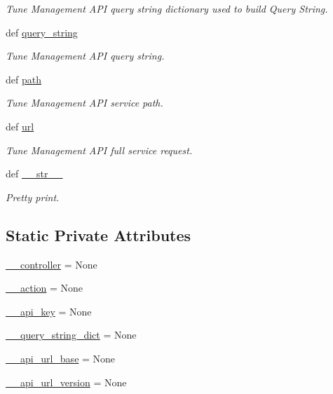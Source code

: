 \begin{DoxyCompactItemize}
\begin{DoxyCompactList}\small\item\em Tune Management A\-P\-I query string dictionary used to build Query String. \end{DoxyCompactList}\item 
def \hyperlink{classtune_1_1management_1_1service_1_1request_1_1Request_adfe1bde13c0956896cac9925bd20d723}{query\-\_\-string}
\begin{DoxyCompactList}\small\item\em Tune Management A\-P\-I query string. \end{DoxyCompactList}\item 
def \hyperlink{classtune_1_1management_1_1service_1_1request_1_1Request_a7a10f1e3cf3559c4a4bc0449c8aedc23}{path}
\begin{DoxyCompactList}\small\item\em Tune Management A\-P\-I service path. \end{DoxyCompactList}\item 
def \hyperlink{classtune_1_1management_1_1service_1_1request_1_1Request_a4842aa40cbc1e2df7f33cb0febfd33df}{url}
\begin{DoxyCompactList}\small\item\em Tune Management A\-P\-I full service request. \end{DoxyCompactList}\item 
def \hyperlink{classtune_1_1management_1_1service_1_1request_1_1Request_a6a49b5dedd5afb3be4bbc38918c604e1}{\-\_\-\-\_\-str\-\_\-\-\_\-}
\begin{DoxyCompactList}\small\item\em Pretty print. \end{DoxyCompactList}\end{DoxyCompactItemize}
\subsection*{Static Private Attributes}
\begin{DoxyCompactItemize}
\item 
\hyperlink{classtune_1_1management_1_1service_1_1request_1_1Request_a16ea1de1e3528c170d6d6d4e886d8a57}{\-\_\-\-\_\-controller} = None
\item 
\hyperlink{classtune_1_1management_1_1service_1_1request_1_1Request_a4cfd4168ab674ad3c00f1c51042fdb52}{\-\_\-\-\_\-action} = None
\item 
\hyperlink{classtune_1_1management_1_1service_1_1request_1_1Request_a22c60e8b0bc6ebf34ef274bad727c326}{\-\_\-\-\_\-api\-\_\-key} = None
\item 
\hyperlink{classtune_1_1management_1_1service_1_1request_1_1Request_aa260968d316e04dd072fb75d678cd09f}{\-\_\-\-\_\-query\-\_\-string\-\_\-dict} = None
\item 
\hyperlink{classtune_1_1management_1_1service_1_1request_1_1Request_a96e16362ed19c5a920c8db329ed1efc2}{\-\_\-\-\_\-api\-\_\-url\-\_\-base} = None
\item 
\hyperlink{classtune_1_1management_1_1service_1_1request_1_1Request_a32a69015326a6969e0da384e9a444641}{\-\_\-\-\_\-api\-\_\-url\-\_\-version} = None
\end{DoxyCompactItemize}



